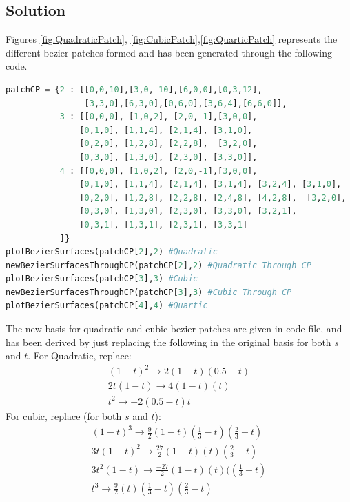 \documentclass[a4paper, 11pt]{article}
\begin{document}
\begin{enumerate}
\begin{enumerate}[label=\alph*.]
    \subsection*{Solution}
    Figures \ref{fig:QuadraticPatch}, \ref{fig:CubicPatch},\ref{fig:QuarticPatch} represents the different bezier patches formed and has been generated through the following code. 
    \begin{lstlisting}[language=Python]
patchCP = {2 : [[0,0,10],[3,0,-10],[6,0,0],[0,3,12],
                [3,3,0],[6,3,0],[0,6,0],[3,6,4],[6,6,0]],
           3 : [[0,0,0], [1,0,2], [2,0,-1],[3,0,0],
               [0,1,0], [1,1,4], [2,1,4], [3,1,0],
               [0,2,0], [1,2,8], [2,2,8],  [3,2,0],
               [0,3,0], [1,3,0], [2,3,0], [3,3,0]],
           4 : [[0,0,0], [1,0,2], [2,0,-1],[3,0,0],
               [0,1,0], [1,1,4], [2,1,4], [3,1,4], [3,2,4], [3,1,0],
               [0,2,0], [1,2,8], [2,2,8], [2,4,8], [4,2,8],  [3,2,0],
               [0,3,0], [1,3,0], [2,3,0], [3,3,0], [3,2,1],
               [0,3,1], [1,3,1], [2,3,1], [3,3,1]
           ]}
plotBezierSurfaces(patchCP[2],2) #Quadratic
newBezierSurfacesThroughCP(patchCP[2],2) #Quadratic Through CP
plotBezierSurfaces(patchCP[3],3) #Cubic
newBezierSurfacesThroughCP(patchCP[3],3) #Cubic Through CP
plotBezierSurfaces(patchCP[4],4) #Quartic
\end{lstlisting}  
The new basis for quadratic and cubic bezier patches are given in code file, and has been derived by just replacing the following in the original basis for both $s$ and $t$. For Quadratic, replace:
\begin{align*}
    (1-t)^2 \longrightarrow   2(1-t)(0.5-t) \\ 
    2t(1-t) \longrightarrow 4(1-t)(t) \\
    t^2 \longrightarrow -2(0.5-t)t 
\end{align*}
For cubic, replace (for both $s$ and $t$):
\begin{align*}
    (1-t)^3 \longrightarrow   \frac{9}{2}(1-t)(\frac{1}{3}-t)(\frac{2}{3}-t) \\ 
    3t(1-t)^2 \longrightarrow \frac{27}{2}(1-t)(t)(\frac{2}{3}-t)\\
    3t^2(1-t) \longrightarrow \frac{-27}{2}(1-t)(t)((\frac{1}{3}-t) \\
    t^3 \longrightarrow \frac{9}{2}(t)(\frac{1}{3}-t)(\frac{2}{3}-t)
\end{align*}
\clearpage
     \begin{figure}[ht] 
\end{figure}
\end{enumerate}
\end{enumerate}
\end{document}

